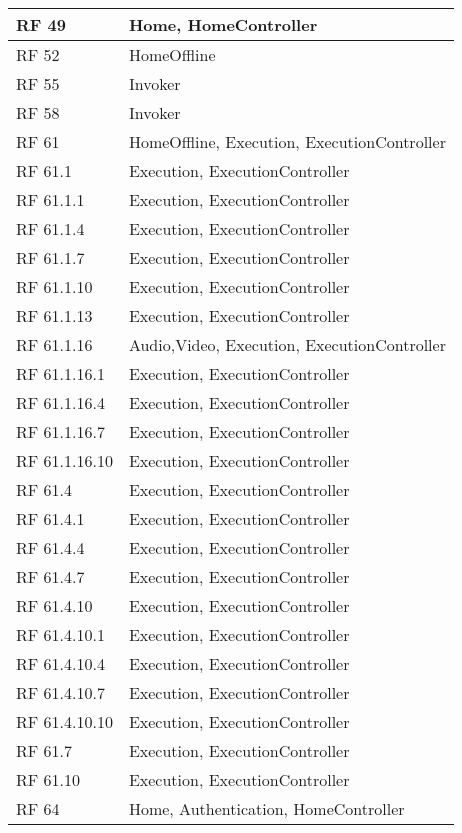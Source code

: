 {\begin{center}
\begin{longtable} [c]{| p{2cm} | p{13cm} |}
	 \hline 
	RF 49 & Home, HomeController\\ 
	 \hline 
	RF 52 & HomeOffline\\ 
	 \hline 
	RF 55 & Invoker\\ 
	 \hline 
	RF 58 & Invoker\\ 
	 \hline 
	RF 61 & HomeOffline, Execution, ExecutionController\\ 
	 \hline 
	RF 61.1 & Execution, ExecutionController\\ 
	 \hline 
	RF 61.1.1 & Execution, ExecutionController\\ 
	 \hline 
	RF 61.1.4 & Execution, ExecutionController\\ 
	 \hline 
	RF 61.1.7 & Execution, ExecutionController\\ 
	 \hline 
	RF 61.1.10 & Execution, ExecutionController\\ 
	 \hline 
	RF 61.1.13 & Execution, ExecutionController\\ 
	 \hline 
	RF 61.1.16 & Audio,Video, Execution, ExecutionController\\ 
	 \hline 
	RF 61.1.16.1 & Execution, ExecutionController\\ 
	 \hline 
	RF 61.1.16.4 & Execution, ExecutionController\\ 
	 \hline 
	RF 61.1.16.7 & Execution, ExecutionController\\ 
	 \hline 
	RF 61.1.16.10 & Execution, ExecutionController\\ 
	 \hline 
	RF 61.4 & Execution, ExecutionController\\ 
	 \hline 
	RF 61.4.1 & Execution, ExecutionController\\ 
	 \hline 
	RF 61.4.4 & Execution, ExecutionController\\ 
	 \hline 
	RF 61.4.7 & Execution, ExecutionController\\ 
	 \hline 
	RF 61.4.10 & Execution, ExecutionController\\ 
	 \hline 
	RF 61.4.10.1 & Execution, ExecutionController\\ 
	 \hline 
	RF 61.4.10.4 & Execution, ExecutionController\\ 
	 \hline 
	RF 61.4.10.7 & Execution, ExecutionController\\ 
	 \hline 
	RF 61.4.10.10 & Execution, ExecutionController\\ 
	 \hline 
	RF 61.7 & Execution, ExecutionController\\ 
	 \hline 
	RF 61.10 & Execution, ExecutionController\\ 
	 \hline 
	RF 64 & Home, Authentication, HomeController\\ 

\end{longtable}
\end{center}}
